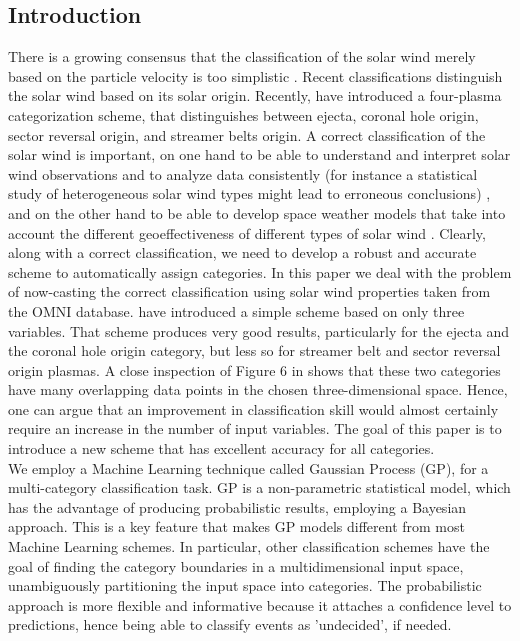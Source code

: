 \documentclass[draft,jgrga]{agutex}
\begin{document}
%
%



\begin{article}


\section{Introduction}\label{sec:intro}
There is a growing consensus that the classification of the solar wind merely based on the particle velocity is too simplistic \citep{zurbuchen02, salem03, zurbuchen07, borovsky12, stakhiv15}.
Recent classifications distinguish the solar wind based on its solar origin. Recently, \citet{xu2015} have introduced a four-plasma categorization scheme, that distinguishes between ejecta, coronal hole origin, sector reversal origin, and streamer belts origin. A correct classification of the solar wind is important, on one hand to be able to understand and interpret solar wind observations and to analyze data consistently (for instance a statistical study of heterogeneous solar wind types might lead to erroneous conclusions) \citep{wimmer06, borovsky12b, borovsky16, kilpua16, neugebauer16}, and on the other hand to be able to develop space weather models that take into account the different geoeffectiveness of different types of solar wind \citep{crooker77, chen97,gopalswamy15, wing16, riley17}. 
Clearly, along with a correct classification, we need to develop a robust and accurate scheme to {automatically assign} categories. {In this paper we deal with the problem of now-casting the correct classification using solar wind properties taken from the OMNI database.}
\citet{xu2015} have introduced a simple scheme based on only three variables. That scheme produces very good results, particularly for the ejecta and the coronal hole origin category, but less so for streamer belt and sector reversal origin plasmas.
A close inspection of Figure 6 in \citet{xu2015} shows that these two categories have many overlapping data points in the chosen three-dimensional space. Hence, one can argue that an improvement in {classification skill} would almost certainly require an increase in the number of input variables. 
The goal of this paper is to introduce a new scheme that has excellent accuracy for all categories. \\
We employ a Machine Learning technique called Gaussian Process (GP), for a multi-category classification task. GP is a non-parametric statistical model, which has the advantage of producing probabilistic {results, employing a Bayesian approach}. This is a key feature that makes GP models different from most Machine Learning schemes. In particular, other classification schemes have the goal of finding the category boundaries in a multidimensional input space, unambiguously partitioning the input space into categories. The probabilistic approach is more flexible and informative because it attaches a confidence level to predictions, hence being able to classify events as 'undecided', if needed.


\end{article}
\end{document}
